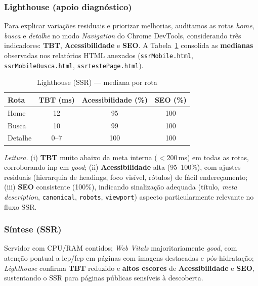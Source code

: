 \subsubsection*{Lighthouse (apoio diagnóstico)}
Para explicar variações residuais e priorizar melhorias, auditamos as rotas \emph{home}, \emph{busca} e \emph{detalhe} no modo \emph{Navigation} do Chrome DevTools, considerando três indicadores: \textbf{TBT}, \textbf{Acessibilidade} e \textbf{SEO}.
A Tabela~\ref{tab:lh-ssr} consolida as \textbf{medianas} observadas nos relatórios HTML anexados (\texttt{ssrMobile.html}, \texttt{ssrMobileBusca.html}, \texttt{ssrtestePage.html}).

\begin{table}[H]
\centering
\caption{Lighthouse (SSR) — mediana por rota}
\label{tab:lh-ssr}
\begin{tabular}{|l|c|c|c|}
\hline
\textbf{Rota} & \textbf{TBT (ms)} & \textbf{Acessibilidade (\%)} & \textbf{SEO (\%)} \\
\hline
Home    & 12 & 95  & 100 \\
Busca   & 10 & 99  & 100 \\
Detalhe & 0--7\footnotemark[1] & 100 & 100 \\
\hline
\end{tabular}
\end{table}

\noindent \textit{Leitura.}
(i) \textbf{TBT} muito abaixo da meta interna ($<200$\,ms) em todas as rotas, corroborando \acrshort{inp} em \textit{good};
(ii) \textbf{Acessibilidade} alta (95--100\%), com ajustes residuais (hierarquia de headings, foco visível, rótulos) de fácil endereçamento;
(iii) \textbf{SEO} consistente (100\%), indicando sinalização adequada (título, \emph{meta description}, \texttt{canonical}, \texttt{robots}, \texttt{viewport}) aspecto particularmente relevante no fluxo SSR.

\subsubsection*{Síntese (SSR)}
Servidor com CPU/RAM contidos; \emph{Web Vitals} majoritariamente \textit{good}, com atenção pontual a \acrshort{lcp}/\acrshort{fcp} em páginas com imagens destacadas e pós-hidratação; \emph{Lighthouse} confirma \textbf{TBT} reduzido e \textbf{altos escores} de \textbf{Acessibilidade} e \textbf{SEO}, sustentando o SSR para páginas públicas sensíveis à descoberta.

